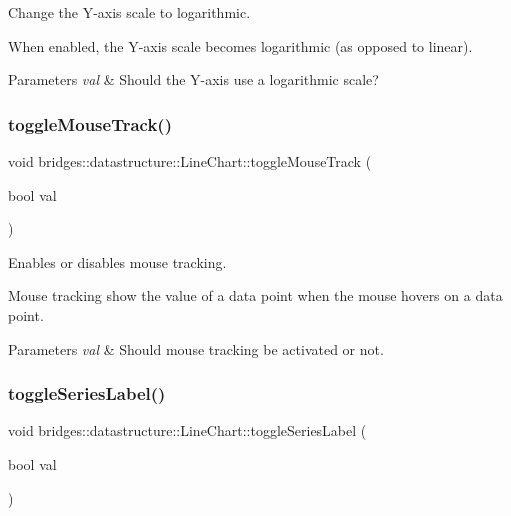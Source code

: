 Change the Y-\/axis scale to logarithmic. 

When enabled, the Y-\/axis scale becomes logarithmic (as opposed to linear).


\begin{DoxyParams}{Parameters}
{\em val} & Should the Y-\/axis use a logarithmic scale? \\
\hline
\end{DoxyParams}
\mbox{\label{classbridges_1_1datastructure_1_1_line_chart_aece56ea5afaf10037b698673801c4496}} 
\subsubsection{\texorpdfstring{toggleMouseTrack()}{toggleMouseTrack()}}
{\footnotesize\ttfamily void bridges\+::datastructure\+::\+Line\+Chart\+::toggle\+Mouse\+Track (\begin{DoxyParamCaption}\item[{bool}]{val }\end{DoxyParamCaption})\hspace{0.3cm}{\ttfamily [inline]}}



Enables or disables mouse tracking. 

Mouse tracking show the value of a data point when the mouse hovers on a data point.


\begin{DoxyParams}{Parameters}
{\em val} & Should mouse tracking be activated or not. \\
\hline
\end{DoxyParams}
\mbox{\label{classbridges_1_1datastructure_1_1_line_chart_a21031cd026426ab91307626ce9651c03}} 
\subsubsection{\texorpdfstring{toggleSeriesLabel()}{toggleSeriesLabel()}}
{\footnotesize\ttfamily void bridges\+::datastructure\+::\+Line\+Chart\+::toggle\+Series\+Label (\begin{DoxyParamCaption}\item[{bool}]{val }\end{DoxyParamCaption})\hspace{0.3cm}{\ttfamily [inline]}}



